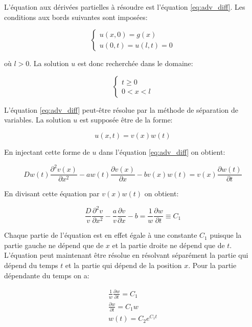 \documentclass[a4paper, 12pt]{report}
\begin{document}
L'équation aux dérivées partielles à résoudre est l'équation \eqref{eq:adv_diff}. Les conditions
aux bords suivantes sont imposées:

\begin{equation}
  \left \{
  \begin{aligned}
    u(x,0) = g(x)\\
    u(0,t) = u(l,t) = 0
  \end{aligned}
  \right.
\end{equation}

où $l > 0$. La solution $u$ est donc recherchée dans le domaine:

\begin{equation}
  \left \{
  \begin{aligned}
    t \ge 0\\
    0 < x < l
  \end{aligned}
  \right.
\end{equation}

L'équation \eqref{eq:adv_diff} peut-être résolue par la méthode de séparation de
variables. La solution $u$ est supposée être de la forme:

\begin{equation}
  u(x,t) = v(x) w(t)
\end{equation}

En injectant cette forme de $u$ dans l'équation \eqref{eq:adv_diff} on obtient:

\begin{equation}
D w(t) \frac{\partial^2 v(x)}{\partial x^2} - a w(t) \frac{\partial v(x)}{\partial x} - b v(x) w(t) = v(x) \frac{\partial w(t)}{\partial t}
\end{equation}

En divisant cette équation par $v(x) w(t)$ on obtient:

\begin{equation}
  \frac{D}{v} \frac{\partial^2 v}{\partial x^2} - \frac{a}{v} \frac{\partial v}{\partial x} -b = \frac{1}{w} \frac{\partial w}{\partial t} \equiv C_1
\end{equation}

Chaque partie de l'équation est en effet égale à une constante $C_1$ puisque
la partie gauche ne dépend que de $x$ et la partie droite ne dépend que de $t$.
L'équation peut maintenant être résolue en résolvant séparément la partie
qui dépend du temps $t$ et la partie qui dépend de la position $x$. Pour la
partie dépendante du temps on a:

\begin{align}
\frac{1}{w} \frac{\partial w}{\partial t} = C_1\\
\frac{\partial w}{\partial t} = C_1 w\\
w(t) = C_{2} e^{C_1 t}
\end{align}
\end{document}
